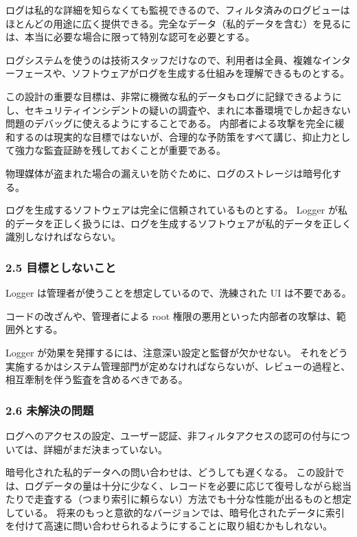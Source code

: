 \documentclass[uplatex]{jsarticle}
\begin{document}
ログは私的な詳細を知らなくても監視できるので、フィルタ済みのログビューはほとんどの用途に広く提供できる。完全なデータ（私的データを含む）を見るには、本当に必要な場合に限って特別な認可を必要とする。

ログシステムを使うのは技術スタッフだけなので、利用者は全員、複雑なインターフェースや、ソフトウェアがログを生成する仕組みを理解できるものとする。

この設計の重要な目標は、非常に機微な私的データもログに記録できるようにし、セキュリティインシデントの疑いの調査や、まれに本番環境でしか起きない問題のデバッグに使えるようにすることである。
内部者による攻撃を完全に緩和するのは現実的な目標ではないが、合理的な予防策をすべて講じ、抑止力として強力な監査証跡を残しておくことが重要である。

物理媒体が盗まれた場合の漏えいを防ぐために、ログのストレージは暗号化する。

ログを生成するソフトウェアは完全に信頼されているものとする。
Logger が私的データを正しく扱うには、ログを生成するソフトウェアが私的データを正しく識別しなければならない。

\subsubsection{2.5 目標としないこと}

Logger は管理者が使うことを想定しているので、洗練された UI は不要である。

コードの改ざんや、管理者による root 権限の悪用といった内部者の攻撃は、範囲外とする。

Logger が効果を発揮するには、注意深い設定と監督が欠かせない。
それをどう実施するかはシステム管理部門が定めなければならないが、レビューの過程と、相互牽制を伴う監査を含めるべきである。

\subsubsection{2.6 未解決の問題}

ログへのアクセスの設定、ユーザー認証、非フィルタアクセスの認可の付与については、詳細がまだ決まっていない。

暗号化された私的データへの問い合わせは、どうしても遅くなる。
この設計では、ログデータの量は十分に少なく、レコードを必要に応じて復号しながら総当たりで走査する（つまり索引に頼らない）方法でも十分な性能が出るものと想定している。
将来のもっと意欲的なバージョンでは、暗号化されたデータに索引を付けて高速に問い合わせられるようにすることに取り組むかもしれない。
\end{document}
